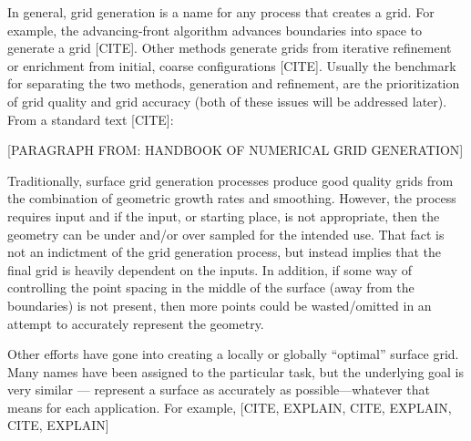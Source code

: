 In general, grid generation is a name for any process that creates a grid. For example, the advancing-front algorithm advances boundaries into space to generate a grid \cite{tristrano98, diaz-morcillo98}[CITE]. Other methods generate grids from iterative refinement or enrichment from initial, coarse configurations \cite{marcum98, marcum00, shewchuk02}[CITE]. Usually the benchmark for separating the two methods, generation and refinement, are the prioritization of grid quality and grid accuracy (both of these issues will be addressed later). From a standard text [CITE]:

[PARAGRAPH FROM: HANDBOOK OF NUMERICAL GRID GENERATION]

Traditionally, surface grid generation processes produce good quality grids from the combination of geometric growth rates and smoothing. However, the process requires input and if the input, or starting place, is not appropriate, then the geometry can be under and/or over sampled for the intended use. That fact is not an indictment of the grid generation process, but instead implies that the final grid is heavily dependent on the inputs. In addition, if some way of controlling the point spacing in the middle of the surface (away from the boundaries) is not present, then more points could be wasted/omitted in an attempt to accurately represent the geometry.

Other efforts have gone into creating a locally or globally ``optimal'' surface grid. Many names have been assigned to the particular task, but the underlying goal is very similar --- represent a surface as accurately as possible---whatever that means for each application. For example, [CITE, EXPLAIN, CITE, EXPLAIN, CITE, EXPLAIN]
